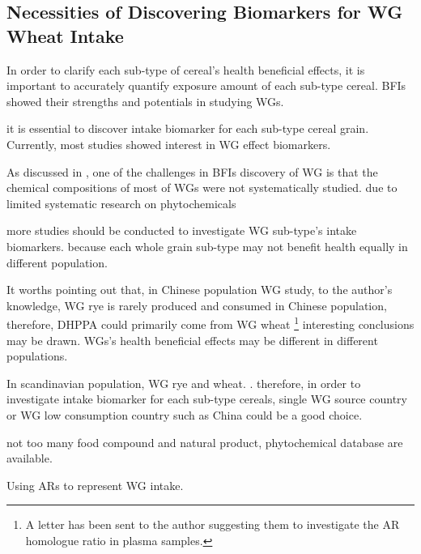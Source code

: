 \subsection{Necessities of Discovering Biomarkers for WG Wheat Intake}
In order to clarify each sub-type of cereal's health beneficial effects, it is important to accurately quantify exposure amount of each sub-type cereal. BFIs showed their strengths and potentials in studying WGs. 

it is essential to discover intake biomarker for each sub-type cereal grain.
Currently, most studies showed interest in WG effect biomarkers.

As discussed in \cite{ISI:000447355100002}, one of the challenges in BFIs discovery of WG is that the chemical compositions of most of WGs were not systematically studied. due to limited systematic research on phytochemicals 

more studies should be conducted to investigate WG sub-type's intake biomarkers. because each whole grain sub-type may not benefit health equally in different population.

It worths pointing out that, in Chinese population WG study, to the author's knowledge, WG rye is rarely produced and consumed in Chinese population, therefore, DHPPA could primarily come from WG wheat \footnote{A letter has been sent to the author suggesting them to investigate the AR homologue ratio in plasma samples. }
interesting conclusions may be drawn. WGs's health beneficial effects may be different in different populations.

In scandinavian population, WG rye and wheat. . therefore, in order to investigate intake biomarker for each sub-type cereals, single WG source country or WG low consumption country such as China could be a good choice.

not too many food compound and natural product, phytochemical database are available.

Using ARs to represent WG intake.
